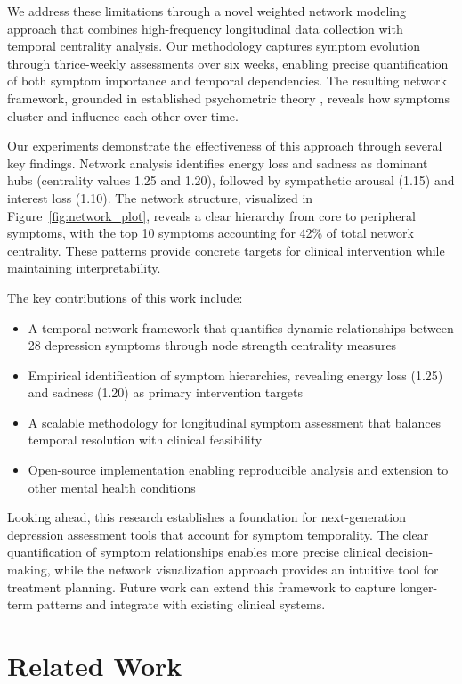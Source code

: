 \documentclass{article} %
\begin{document}
We address these limitations through a novel weighted network modeling approach that combines high-frequency longitudinal data collection with temporal centrality analysis. Our methodology captures symptom evolution through thrice-weekly assessments over six weeks, enabling precise quantification of both symptom importance and temporal dependencies. The resulting network framework, grounded in established psychometric theory \citep{Marsman2018AnIT}, reveals how symptoms cluster and influence each other over time.

Our experiments demonstrate the effectiveness of this approach through several key findings. Network analysis identifies energy loss and sadness as dominant hubs (centrality values 1.25 and 1.20), followed by sympathetic arousal (1.15) and interest loss (1.10). The network structure, visualized in Figure~\ref{fig:network_plot}, reveals a clear hierarchy from core to peripheral symptoms, with the top 10 symptoms accounting for 42\% of total network centrality. These patterns provide concrete targets for clinical intervention while maintaining interpretability.

The key contributions of this work include:
\begin{itemize}
    \item A temporal network framework that quantifies dynamic relationships between 28 depression symptoms through node strength centrality measures
    \item Empirical identification of symptom hierarchies, revealing energy loss (1.25) and sadness (1.20) as primary intervention targets
    \item A scalable methodology for longitudinal symptom assessment that balances temporal resolution with clinical feasibility
    \item Open-source implementation enabling reproducible analysis and extension to other mental health conditions
\end{itemize}

Looking ahead, this research establishes a foundation for next-generation depression assessment tools that account for symptom temporality. The clear quantification of symptom relationships enables more precise clinical decision-making, while the network visualization approach provides an intuitive tool for treatment planning. Future work can extend this framework to capture longer-term patterns and integrate with existing clinical systems.

\section{Related Work}
\label{sec:related}
\end{document}

